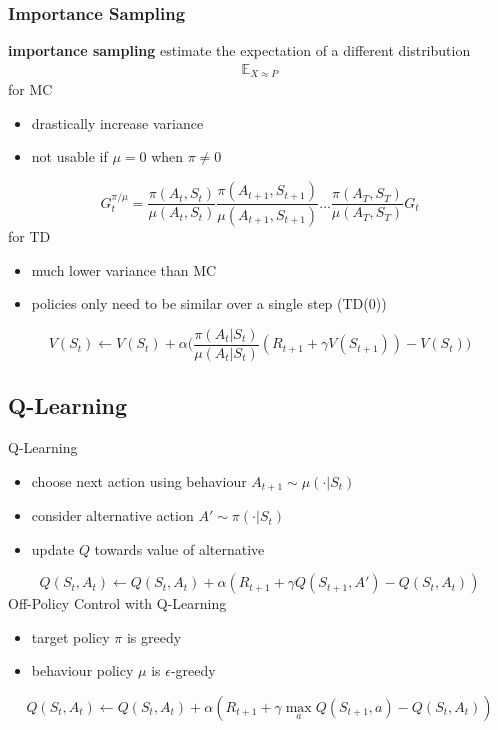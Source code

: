 \documentclass[]{article}
\theoremstyle{definition}
\newcommand{\E}{\mathbb{E}}
\begin{document}
\subsubsection{Importance Sampling}%
\label{ssub:importance_sampling}
\textbf{importance sampling} estimate the expectation of a different distribution
\begin{align*}
    \E_{X \approx P}
\end{align*}
for MC
\begin{itemize}
    \item drastically increase variance
    \item not usable if $\mu = 0$ when $\pi \not = 0$
\end{itemize}
\begin{equation*}
    G_t^{\pi / \mu} = \frac{\pi(A_t, S_t)}{\mu(A_t, S_t)}\frac{\pi(A_{t+1}, S_{t+1})}{\mu(A_{t+1}, S_{t+1})}\ldots \frac{\pi(A_T, S_T)}{\mu(A_T, S_T)} G_t
\end{equation*}
for TD
\begin{itemize}
    \item much lower variance than MC
    \item policies only need to be similar over a single step (TD(0))
\end{itemize}
\begin{equation*}
    V(S_t) \gets V(S_t) + \alpha\Big(\frac{\pi(A_t | S_t)}{\mu(A_t|S_t)} (R_{t+1} + \gamma V(S_{t+1})) - V(S_t)\Big)
\end{equation*}

\subsection{Q-Learning}%
\label{sub:q_learning}
Q-Learning
\begin{itemize}
    \item choose next action using behaviour $A_{t+1} \sim \mu(\cdot | S_t)$
    \item consider alternative action $A' \sim \pi(\cdot | S_t)$
    \item update $Q$ towards value of alternative
\end{itemize}
\begin{equation*}
    Q(S_t, A_t) \gets Q(S_t, A_t) + \alpha (R_{t+1} + \gamma Q (S_{t+1}, A') - Q(S_t, A_t))
\end{equation*}
Off-Policy Control with Q-Learning
\begin{itemize}
    \item target policy $\pi$ is greedy
    \item behaviour policy $\mu$ is $\epsilon$-greedy
\end{itemize}
\begin{equation*}
    Q(S_t, A_t) \gets Q(S_t, A_t) + \alpha (R_{t+1} + \gamma \max_{a} Q (S_{t+1}, a) - Q(S_t, A_t))
\end{equation*}
\end{document}
